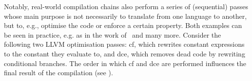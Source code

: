\documentclass[dvipsnames,conference]{IEEEtran}
\theoremstyle{definition}
\begin{document}
Notably, real-world compilation chains also perform a series of (sequential) passes whose main purpose is not necessarily to translate from one language to another, but to, e.g., optimise the code or enforce a certain property.
Both examples can be seen in practice, e.g. as in the work of~\cite{nagarakatte2009soft,nagarakatte2010cets,akritidis2009baggy,wegman1991ccp,manjikian1997fusion} and many more.
% 
Consider the following two LLVM optimisation passes: \gls*{cf}, which rewrites constant expressions to the constant they evaluate to, and \gls*{dce}, which removes dead code by rewriting conditional branches.
The order in which \gls*{cf} and \gls*{dce} are performed influences the final result of the compilation (see ).
\end{document}
